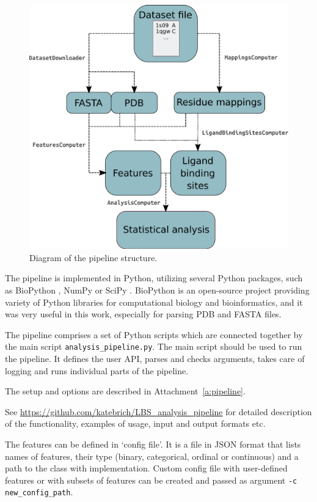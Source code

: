 \begin{figure}[!h]\centering
\includegraphics[width=140mm]{../img/pipelineDiagram.pdf}
\caption{Diagram of the pipeline structure.}
\label{fig:diagram}
\end{figure}

The pipeline is implemented in Python, utilizing several Python packages, such as BioPython \cite{biopython}, NumPy \cite{numpy} or SciPy \cite{scipy}. BioPython is an open-source project providing variety of Python libraries for computational biology and bioinformatics, and it was very useful in this work, especially for parsing PDB and FASTA files.

The pipeline comprises a set of Python scripts which are connected together by the main script \texttt{analysis\_pipeline.py}. The main script should be used to run the pipeline. It defines the user API, parses and checks arguments, takes care of logging and runs individual parts of the pipeline. 


The setup and options are described in Attachment~\ref{a:pipeline}.

See \url{https://github.com/katebrich/LBS_analysis_pipeline} for detailed description of the functionality, examples of usage, input and output formats etc.

The features can be defined in `config file'. It is a file in JSON format that lists names of features, their type (binary, categorical, ordinal or continuous) and a path to the class with implementation. Custom config file with user-defined features or with subsets of features can be created and passed as argument \texttt{-c new\_config\_path}.

